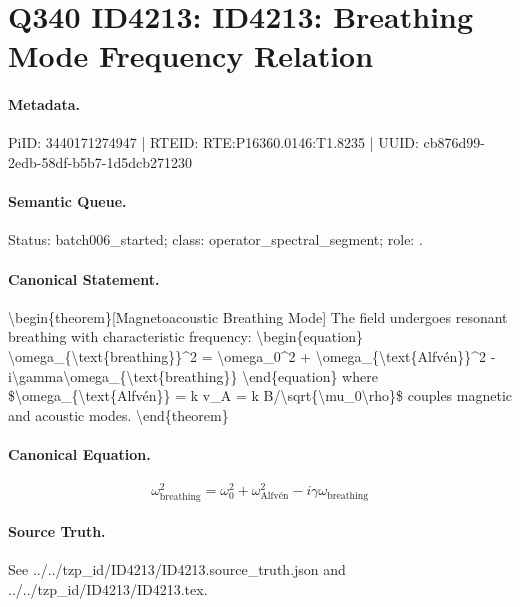 \section*{Q340 ID4213: ID4213: Breathing Mode Frequency Relation}
\paragraph{Metadata.}
PiID: 3440171274947 | RTEID: RTE:P16360.0146:T1.8235 | UUID: cb876d99-2edb-58df-b5b7-1d5dcb271230

\paragraph{Semantic Queue.}
Status: batch006\_started; class: operator\_spectral\_segment; role: .

\paragraph{Canonical Statement.}
\textbackslash{}begin\{theorem\}[Magnetoacoustic Breathing Mode] The field undergoes resonant breathing with characteristic frequency: \textbackslash{}begin\{equation\} \textbackslash{}omega\_\{\textbackslash{}text\{breathing\}\}\textasciicircum{}2 = \textbackslash{}omega\_0\textasciicircum{}2 + \textbackslash{}omega\_\{\textbackslash{}text\{Alfvén\}\}\textasciicircum{}2 - i\textbackslash{}gamma\textbackslash{}omega\_\{\textbackslash{}text\{breathing\}\} \textbackslash{}end\{equation\} where \$\textbackslash{}omega\_\{\textbackslash{}text\{Alfvén\}\} = k v\_A = k B/\textbackslash{}sqrt\{\textbackslash{}mu\_0\textbackslash{}rho\}\$ couples magnetic and acoustic modes. \textbackslash{}end\{theorem\}

\paragraph{Canonical Equation.}
\[
\begin{equation} \omega_{\text{breathing}}^2 = \omega_0^2 + \omega_{\text{Alfvén}}^2 - i\gamma\omega_{\text{breathing}} \end{equation}
\]

\paragraph{Source Truth.}
See ../../tzp\_id/ID4213/ID4213.source\_truth.json and ../../tzp\_id/ID4213/ID4213.tex.
